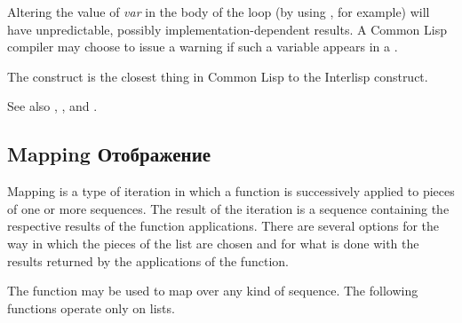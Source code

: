 \begin{defmac}
Altering the value of \emph{var} in the body of the loop (by using ,
for example) will have unpredictable, possibly implementation-dependent
results.  A Common Lisp compiler may choose to issue a warning if such a variable
appears in a .

\beforenoterule
\begin{incompatibility}
The  construct is the closest thing
in Common Lisp to the Interlisp  construct.
\end{incompatibility}
\afternoterule
\end{defmac}

See also , ,
and .

\subsection{Mapping Отображение}

Mapping is a type of iteration in which a function is 
successively applied to pieces of one or more sequences.
The result of the iteration is a sequence containing the respective
results of the function applications.
There are several options for the way in which the pieces of the list are
chosen and for what is done with the results returned by the applications of
the function.

The function  may be used to map over any kind of sequence.
The following functions operate only on lists.

